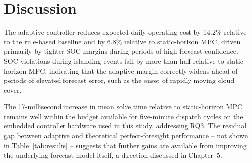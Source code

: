 \section{Discussion}

The adaptive controller reduces expected daily operating cost by 14.2\% relative to the rule-based baseline and by 6.8\% relative to static-horizon MPC, driven primarily by tighter SOC margins during periods of high forecast confidence. SOC violations during islanding events fall by more than half relative to static-horizon MPC, indicating that the adaptive margin correctly widens ahead of periods of elevated forecast error, such as the onset of rapidly moving cloud cover.

The 17-millisecond increase in mean solve time relative to static-horizon MPC remains well within the budget available for five-minute dispatch cycles on the embedded controller hardware used in this study, addressing RQ3. The residual gap between adaptive and theoretical perfect-foresight performance -- not shown in Table~\ref{tab:results} -- suggests that further gains are available from improving the underlying forecast model itself, a direction discussed in Chapter~5.

